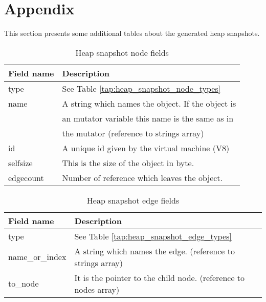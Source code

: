 \section{Appendix}

This section presents some additional tables about the generated heap snapshots.

\begin{table}[!htbp]
	\centering
	\begin{tabular}{|l||l|}
		\hline
		\textbf{Field name}	& \textbf{Description} 				\\ \hline \hline
		type & See Table \ref{tap:heap_snapshot_node_types}			\\ \hline
		name & A string which names the object. If the object is	\\
			 & an mutator variable this name is the same as in 		\\
			 & the mutator (reference to strings array)				\\ \hline	
		id	 & A unique id given by the virtual machine (V8)		\\ \hline
		selfsize  & This is the size of the object in byte. 		\\ \hline
		edgecount &	Number of reference which leaves the object.	\\ \hline	
	\end{tabular}
	\caption{Heap snapshot node fields}
	\label{tap:heap_snapshot_node_fields}
\end{table}
		
\begin{table}[!htbp]
	\centering
	\begin{tabular}{|l||l|}
		\hline
		\textbf{Field name}	&	\textbf{Description}			\\ \hline \hline
		type & See Table \ref{tap:heap_snapshot_edge_types}		\\ \hline
		name\_or\_index & A string which names the edge. 
							(reference to strings array)		\\	\hline
		to\_node		& It is the pointer to the child node. 
							(reference to nodes array)			\\	\hline 
	\end{tabular}
	\caption{Heap snapshot edge fields}
	\label{tap:heap_snapshot_edge_fields}
\end{table}

